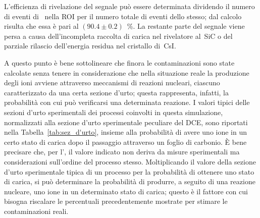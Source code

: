 L'efficienza di rivelazione del segnale può essere determinata dividendo il numero di eventi di~ nella ROI per il numero totale di eventi dello stesso; dal calcolo risulta che essa è pari al $(90.4 \pm 0.2)$~\%.
La restante parte del segnale viene persa a causa dell'incompleta raccolta di carica nel rivelatore al~SiC o del parziale rilascio dell'energia residua nel cristallo di~CsI.






A questo punto è bene sottolineare che finora le contaminazioni sono state calcolate senza tenere in considerazione che nella situazione reale la produzione degli ioni avviene attraverso meccanismi di reazioni nucleari, ciascuno caratterizzato da una certa sezione d'urto; questa rappresenta, infatti, la probabilità con cui può verificarsi una determinata reazione.
I valori tipici delle sezioni d'urto sperimentali dei processi coinvolti in questa simulazione, normalizzati alla sezione d'urto sperimentale peculiare del DCE, sono riportati nella Tabella~\ref{tab:sez_d'urto}, insieme alla probabilità di avere uno ione in un certo stato di carica dopo il passaggio attraverso un foglio di carbonio.
È bene precisare che, per l', il valore indicato non deriva da misure sperimentali ma considerazioni sull'ordine del processo stesso.
Moltiplicando il valore della sezione d'urto sperimentale tipica di un processo per la probabilità di ottenere uno stato di carica, si può determinare la probabilità di produrre, a seguito di una reazione nucleare, uno ione in un determinato stato di carica;
questo è il fattore con cui bisogna riscalare le percentuali precedentemente mostrate per stimare le contaminazioni reali.
